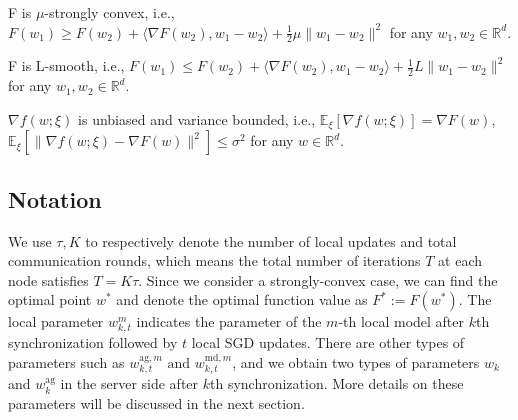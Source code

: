 \begin{assumption} \label{assumption2}
F is $\mu$-strongly convex, i.e., $F(w_1) \geq F(w_2) + \langle \nabla F(w_2), w_1-w_2 \rangle + \frac{1}{2}\mu \|w_1-w_2\|^2$ for any $w_1, w_2 \in \mathbb{R}^d$.
\end{assumption}

\begin{assumption} \label{assumption3}
F is L-smooth, i.e., $F(w_1) \leq F(w_2) + \langle \nabla F(w_2), w_1-w_2 \rangle + \frac{1}{2}L \|w_1-w_2\|^2$ for any $w_1, w_2 \in \mathbb{R}^d$.
\end{assumption}

\begin{assumption} \label{assumption4}
$\nabla f(w; \xi)$ is unbiased and variance bounded, i.e., $\mathbb{E}_\xi[\nabla f(w; \xi)] = \nabla F(w)$, $\mathbb{E}_\xi[\|\nabla f(w; \xi) - \nabla F(w)\|^2] \leq \sigma^2$ for any $w \in \mathbb{R}^d$.
\end{assumption}


\subsection{Notation}

We use $\tau, K$ to respectively denote the number of local updates and total communication rounds, which means the total number of iterations $T$ at each node satisfies $T = K\tau$. Since we consider a strongly-convex case, we can find the optimal point $w^*$ and denote the optimal function value as $F^* := F(w^*)$. The local parameter $w_{k, t}^m$ indicates the parameter of the $m$-th local model after $k$th synchronization followed by $t$ local SGD updates. There are other types of parameters such as $w_{k, t}^{\textrm{ag}, m} \textrm{ and } w_{k, t}^{\textrm{md}, m}$, and we obtain two types of parameters $w_k$ and $w_k^{\textrm{ag}}$ in the server side after $k$th synchronization. More details on these parameters will be discussed in the next section.